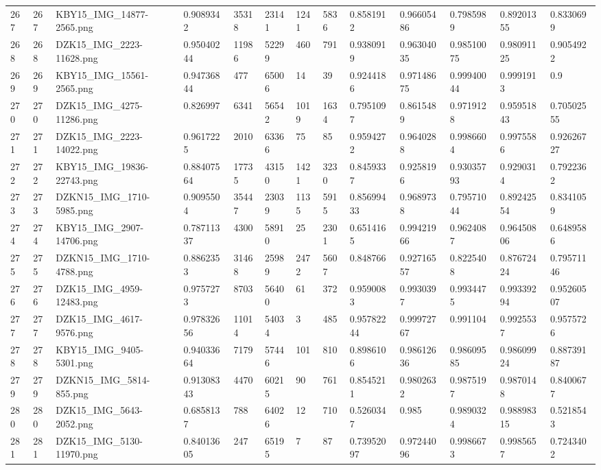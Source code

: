\documentclass[11pt, a4paper, twoside]{report}
\begin{document}
\begin{longtable}[c]{@{}lllllllllllll@{}}
267 & 267 & KBY15\_IMG\_14877-2565.png & 0.9089342 & 35318 & 23141 & 1241 & 5836 & 0.8581912 & 0.96605486 & 0.7985989 & 0.89201355 & 0.8330699 \\
268 & 268 & DZK15\_IMG\_2223-11628.png & 0.95040244 & 11986 & 52299 & 460 & 791 & 0.9380919 & 0.96304035 & 0.98510075 & 0.98091125 & 0.9054922 \\
269 & 269 & KBY15\_IMG\_15561-2565.png & 0.94736844 & 477 & 65006 & 14 & 39 & 0.9244186 & 0.97148675 & 0.99940044 & 0.9991913 & 0.9 \\
270 & 270 & DZK15\_IMG\_4275-11286.png & 0.826997 & 6341 & 56542 & 1019 & 1634 & 0.7951097 & 0.8615489 & 0.9719128 & 0.95951843 & 0.70502555 \\
271 & 271 & DZK15\_IMG\_2223-14022.png & 0.9617225 & 2010 & 63366 & 75 & 85 & 0.9594272 & 0.9640288 & 0.9986604 & 0.9975586 & 0.92626727 \\
272 & 272 & KBY15\_IMG\_19836-22743.png & 0.88407564 & 17735 & 43150 & 1421 & 3230 & 0.8459337 & 0.9258196 & 0.93035793 & 0.9290314 & 0.7922362 \\
273 & 273 & DZKN15\_IMG\_1710-5985.png & 0.9095504 & 35447 & 23039 & 1135 & 5915 & 0.85699433 & 0.9689738 & 0.79571044 & 0.89242554 & 0.8341059 \\
274 & 274 & KBY15\_IMG\_2907-14706.png & 0.78711337 & 4300 & 58910 & 25 & 2301 & 0.6514165 & 0.99421966 & 0.9624087 & 0.96450806 & 0.6489586 \\
275 & 275 & DZKN15\_IMG\_1710-4788.png & 0.8862353 & 31468 & 25989 & 2472 & 5607 & 0.848766 & 0.92716557 & 0.8225408 & 0.87672424 & 0.79571146 \\
276 & 276 & DZK15\_IMG\_4959-12483.png & 0.9757273 & 8703 & 56400 & 61 & 372 & 0.9590083 & 0.9930397 & 0.9934475 & 0.99339294 & 0.95260507 \\
277 & 277 & DZK15\_IMG\_4617-9576.png & 0.97832656 & 11014 & 54034 & 3 & 485 & 0.95782244 & 0.99972767 & 0.991104 & 0.9925537 & 0.9575726 \\
278 & 278 & KBY15\_IMG\_9405-5301.png & 0.94033664 & 7179 & 57446 & 101 & 810 & 0.8986106 & 0.98612636 & 0.98609585 & 0.98609924 & 0.88739187 \\
279 & 279 & DZKN15\_IMG\_5814-855.png & 0.91308343 & 4470 & 60215 & 90 & 761 & 0.8545211 & 0.9802632 & 0.9875197 & 0.9870148 & 0.8400677 \\
280 & 280 & DZK15\_IMG\_5643-2052.png & 0.6858137 & 788 & 64026 & 12 & 710 & 0.5260347 & 0.985 & 0.9890324 & 0.98898315 & 0.5218543 \\
281 & 281 & DZK15\_IMG\_5130-11970.png & 0.84013605 & 247 & 65195 & 7 & 87 & 0.73952097 & 0.97244096 & 0.9986673 & 0.9985657 & 0.7243402 \\

\end{longtable}
\end{document}
